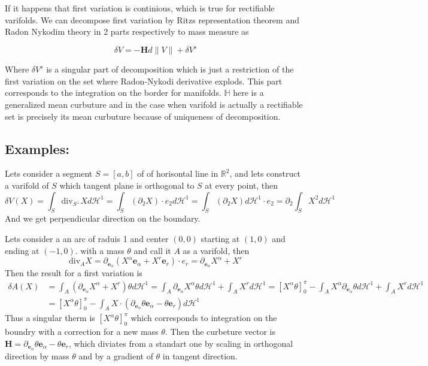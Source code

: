 \vspace{2ex}
If it happens that first variation is continious, which is true for rectifiable
varifolds. We can decompose first variation by Ritzs representation theorem and
Radon Nykodim theory in 2 parts respectively to mass measure as

\[\delta V = -\mathbf Hd\|V\|+\delta V^s\]

Where $\delta V^s$ is a singular part of decomposition which is just a restriction
of the first variation on the set where Radon-Nykodi  derivative explods. This
part corresponds to the integration on the border for manifolds. $\mathbb H$
here is a generalized mean curbuture and in the case when varifold is actually
a rectifiable set is precisely its mean curbuture because of uniqueness of
decomposition.

\subsection{Examples:}
Lets consider a segment $S=[a,b]$ of of horisontal line in $\mathbb R^2$, and lets construct a
varifold of $S$ which tangent plane is orthogonal to $S$ at every point, then
\[\delta V( X) = \int_S\text{div}_{S^\bot}Xd\mathcal H^1 = \int_S(\partial_2 X)\cdot e_2d\mathcal H^1=
\int_S(\partial_2 X)d\mathcal H^1\cdot e_2=\partial_2\int_S X^2d\mathcal H^1\]
And we get perpendicular direction on the boundary.

\vspace{2ex}
Lets consider a an arc of raduis 1 and center $(0,0)$ starting at $(1,0)$
and ending at $(-1,0)$. with a mass $\theta$ and call it $A$ as a varifold, then
\[\text{div}_AX=\partial_{\mathbf e_\alpha}(X^\alpha\mathbf e_\alpha+X^r\mathbf e_r)\cdot e_r
=\partial_{\mathbf e_\alpha}X^\alpha+X^r\]
Then the result for a first variation is
\begin{align*}
\delta A(X)&=\int_A(\partial_{\mathbf e_\alpha}X^\alpha+X^r)\theta d\mathcal H^1
=\int_A\partial_{\mathbf e_\alpha}X^\alpha\theta d\mathcal H^1+\int_A X^rd\mathcal H^1
=[X^\alpha\theta]_0^\pi-\int_AX^\alpha\partial_{\mathbf e_\alpha}\theta d\mathcal H^1+\int_A X^rd\mathcal H^1\\
&=[X^\alpha\theta]_0^\pi-\int_AX\cdot(\partial_{\mathbf e_\alpha}\theta\mathbf e_\alpha-\theta\mathbf e_r)d\mathcal H^1
\end{align*}
Thus a singular therm is $[X^\alpha\theta]_0^\pi$ which corresponds to integration
on the boundry with a correction for a new mass $\theta$. Then the curbeture vector
is $\mathbf H=\partial_{\mathbf e_\alpha}\theta\mathbf e_\alpha-\theta\mathbf e_r$,
which diviates from a standart one by scaling in orthogonal direction by mass
$\theta$ and by a gradient of $\theta$ in tangent direction.
